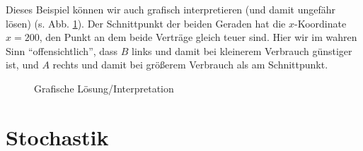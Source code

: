 \documentclass[a4paper]{book}%
\theoremstyle{definition}
\begin{document}
Dieses Beispiel können wir auch grafisch interpretieren (und damit ungefähr lösen) (s. Abb. \ref{fig:lineareGleichungen1}). Der Schnittpunkt der beiden Geraden hat die $x$-Koordinate $x=200$, den Punkt an dem beide Verträge gleich teuer sind. Hier wir im wahren Sinn \enquote{offensichtlich}, dass $B$ links und damit bei kleinerem Verbrauch günstiger ist, und $A$ rechts und damit bei größerem Verbrauch als am Schnittpunkt.
\begin{figure}
  \centering
  \caption{Grafische Lösung/Interpretation}\label{fig:lineareGleichungen1}
\end{figure}


\chapter{Stochastik}
\end{document}

